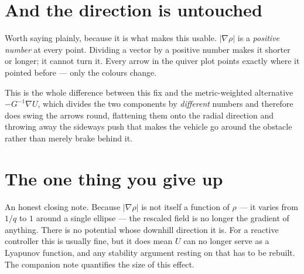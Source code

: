 \documentclass[11pt]{article}
\begin{document}
\section{And the direction is untouched}

Worth saying plainly, because it is what makes this usable. $|\nabla\rho|$ is
a \emph{positive number} at every point. Dividing a vector by a positive
number makes it shorter or longer; it cannot turn it. Every arrow in the
quiver plot points exactly where it pointed before --- only the colours
change.

This is the whole difference between this fix and the metric-weighted
alternative $-G^{-1}\nabla U$, which divides the two components by
\emph{different} numbers and therefore does swing the arrows round, flattening
them onto the radial direction and throwing away the sideways push that makes
the vehicle go around the obstacle rather than merely brake behind it.

\section{The one thing you give up}

An honest closing note. Because $|\nabla\rho|$ is not itself a function of
$\rho$ --- it varies from $1/q$ to $1$ around a single ellipse --- the
rescaled field is no longer the gradient of anything. There is no potential
whose downhill direction it is. For a reactive controller this is usually
fine, but it does mean $U$ can no longer serve as a Lyapunov function, and
any stability argument resting on that has to be rebuilt. The companion note
quantifies the size of this effect.
\end{document}
